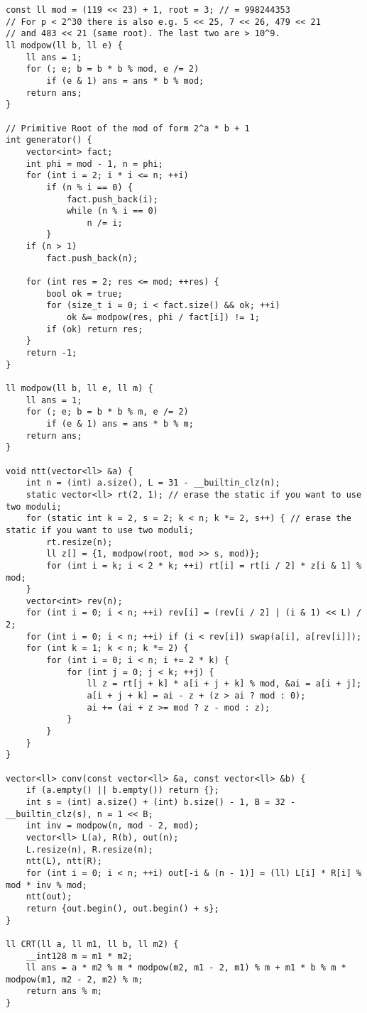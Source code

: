 \begin{lstlisting}[style=cpp]
const ll mod = (119 << 23) + 1, root = 3; // = 998244353
// For p < 2^30 there is also e.g. 5 << 25, 7 << 26, 479 << 21
// and 483 << 21 (same root). The last two are > 10^9.
ll modpow(ll b, ll e) {
    ll ans = 1;
    for (; e; b = b * b % mod, e /= 2)
        if (e & 1) ans = ans * b % mod;
    return ans;
}

// Primitive Root of the mod of form 2^a * b + 1
int generator() {
    vector<int> fact;
    int phi = mod - 1, n = phi;
    for (int i = 2; i * i <= n; ++i)
        if (n % i == 0) {
            fact.push_back(i);
            while (n % i == 0)
                n /= i;
        }
    if (n > 1)
        fact.push_back(n);

    for (int res = 2; res <= mod; ++res) {
        bool ok = true;
        for (size_t i = 0; i < fact.size() && ok; ++i)
            ok &= modpow(res, phi / fact[i]) != 1;
        if (ok) return res;
    }
    return -1;
}

ll modpow(ll b, ll e, ll m) {
    ll ans = 1;
    for (; e; b = b * b % m, e /= 2)
        if (e & 1) ans = ans * b % m;
    return ans;
}

void ntt(vector<ll> &a) {
    int n = (int) a.size(), L = 31 - __builtin_clz(n);
    static vector<ll> rt(2, 1); // erase the static if you want to use two moduli;
    for (static int k = 2, s = 2; k < n; k *= 2, s++) { // erase the static if you want to use two moduli;
        rt.resize(n);
        ll z[] = {1, modpow(root, mod >> s, mod)};
        for (int i = k; i < 2 * k; ++i) rt[i] = rt[i / 2] * z[i & 1] % mod;
    }
    vector<int> rev(n);
    for (int i = 0; i < n; ++i) rev[i] = (rev[i / 2] | (i & 1) << L) / 2;
    for (int i = 0; i < n; ++i) if (i < rev[i]) swap(a[i], a[rev[i]]);
    for (int k = 1; k < n; k *= 2) {
        for (int i = 0; i < n; i += 2 * k) {
            for (int j = 0; j < k; ++j) {
                ll z = rt[j + k] * a[i + j + k] % mod, &ai = a[i + j];
                a[i + j + k] = ai - z + (z > ai ? mod : 0);
                ai += (ai + z >= mod ? z - mod : z);
            }
        }
    }
}

vector<ll> conv(const vector<ll> &a, const vector<ll> &b) {
    if (a.empty() || b.empty()) return {};
    int s = (int) a.size() + (int) b.size() - 1, B = 32 - __builtin_clz(s), n = 1 << B;
    int inv = modpow(n, mod - 2, mod);
    vector<ll> L(a), R(b), out(n);
    L.resize(n), R.resize(n);
    ntt(L), ntt(R);
    for (int i = 0; i < n; ++i) out[-i & (n - 1)] = (ll) L[i] * R[i] % mod * inv % mod;
    ntt(out);
    return {out.begin(), out.begin() + s};
}

ll CRT(ll a, ll m1, ll b, ll m2) {
    __int128 m = m1 * m2;
    ll ans = a * m2 % m * modpow(m2, m1 - 2, m1) % m + m1 * b % m * modpow(m1, m2 - 2, m2) % m;
    return ans % m;
}
\end{lstlisting}

